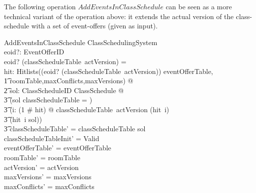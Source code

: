 \documentclass[a4paper]{article}
\begin{document}
\noindent
The following operation $AddEventsInClassSchedule$ can be seen as a more
technical variant of the operation above: it extends the actual version of the
class-schedule with a set of event-offers (given as input).
\begin{schema}{AddEventsInClassSchedule}
  \Delta ClassSchedulingSystem \\
  eoid?: \power EventOfferID \\
  \where
  eoid? \cap \dom (classScheduleTable~actVersion) = \emptyset \\
  \exists hit: Hitlists((eoid? \cup \dom (classScheduleTable~actVersion)) \dres
  eventOfferTable, \\ 
  \t1 roomTable,maxConflicts,maxVersions) @ \\
  \t2 \exists sol: ClassScheduleID \pfun ClassSchedule @ \\
  \t3 (\dom sol \cap \dom classScheduleTable = \emptyset) \land \\
  \t3 (\forall i: (1 \upto \# hit) @ classScheduleTable~actVersion \subseteq
  (hit~i) \land \\ 
  \t3 (hit~i \in \ran sol)) \land \\
  \t3 classScheduleTable' = classScheduleTable \cup sol \\
  classScheduleTableInit' = Valid \\
  eventOfferTable' = eventOfferTable \\
  roomTable' = roomTable \\
  actVersion' = actVersion \\
  maxVersions' = maxVersions \\
  maxConflicts' = maxConflicts \\
\end{schema}
\end{document}
